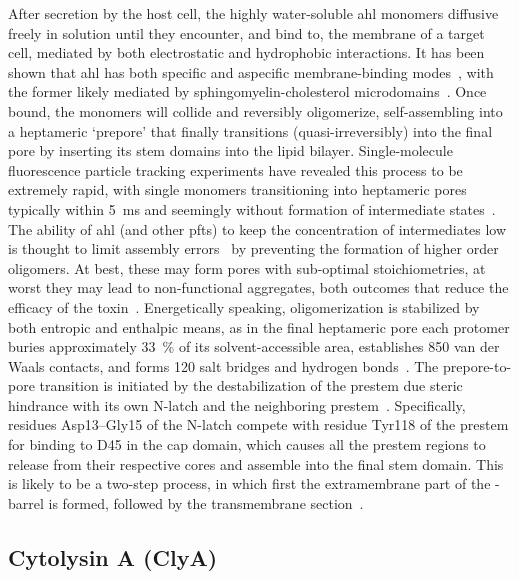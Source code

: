 After secretion by the host cell, the highly water-soluble \gls{ahl} monomers diffusive freely in solution
until they encounter, and bind to, the membrane of a target cell, mediated by both electrostatic and
hydrophobic interactions. It has been shown that \gls{ahl} has both specific and aspecific membrane-binding
modes~\cite{Hildebrand-1991}, with the former likely mediated by sphingomyelin-cholesterol
microdomains~\cite{Valeva-2006}. Once bound, the monomers will collide and reversibly oligomerize,
self-assembling into a heptameric `prepore' that finally transitions (quasi-irreversibly) into the final pore
by inserting its stem domains into the lipid bilayer. Single-molecule
fluorescence particle tracking experiments have revealed this process to be extremely rapid, with single
monomers transitioning into heptameric pores typically within \SI{5}{\ms} and seemingly without formation of
intermediate states~\cite{Thompson-2011}. The ability of \gls{ahl} (and other \glspl{pft}) to keep the
concentration of intermediates low is thought to limit assembly errors~\cite{Lee-2016b} by preventing the
formation of higher order oligomers. At best, these may form pores with sub-optimal stoichiometries, at worst
they may lead to non-functional aggregates, both outcomes that reduce the efficacy of the
toxin~\cite{Fahie-2013,Subburaj-2015}. Energetically speaking, oligomerization is stabilized by
both entropic and enthalpic means, as in the final heptameric pore each protomer buries approximately
\SI{33}{\percent} of its solvent-accessible area, establishes 850 van der Waals contacts, and forms 120 salt
bridges and hydrogen bonds~\cite{Song-1996}. The prepore-to-pore transition is initiated by the
destabilization of the prestem due steric hindrance with its own N-latch and the neighboring
prestem~\cite{Sugawara-2015}. Specifically, residues Asp13--Gly15 of the N-latch compete with residue Tyr118
of the prestem for binding to D45 in the cap domain, which causes all the prestem regions to release from their
respective cores and assemble into the final stem domain. This is likely to be a two-step process, in which
first the extramembrane part of the \tb-barrel is formed, followed by the transmembrane
section~\cite{Sugawara-2015}.



\subsection{Cytolysin A (ClyA)}
%
\label{sec:np:clya}
%

